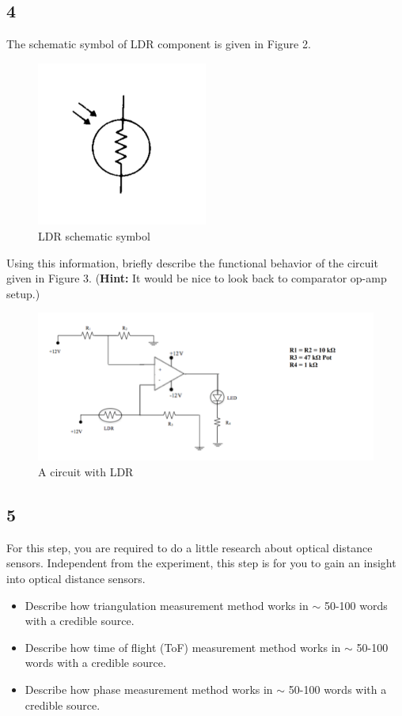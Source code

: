 \documentclass[letterpaper,12pt]{article}
\begin{document}
\subsection*{4}
The schematic symbol of LDR component is given in Figure 2.
\begin{figure}[H]
	\centering
	\includegraphics[width=0.5\textwidth]{LDR_symbol.png}
	\caption{LDR schematic symbol}
\end{figure} 
Using this information, briefly describe the functional behavior of the circuit given in Figure 3. (\textbf{Hint:} It would be nice to look back to comparator op-amp setup.)
\begin{figure}[H]
	\centering
	\includegraphics[width=1\textwidth]{darkness.png}
	\caption{A circuit with LDR}
\end{figure} 

\subsection*{5}
For this step, you are required to do a little research about optical distance sensors. Independent from the experiment, this step is for you to gain an insight into optical distance sensors.
\begin{itemize}
	\item Describe how triangulation measurement method works in \(\sim\) 50-100 words with a credible source. 
	\item Describe how time of flight (ToF) measurement method works in \(\sim\) 50-100 words with a credible source. 
	\item Describe how phase measurement method works in \(\sim\) 50-100 words with a credible source. 
\end{itemize}
\end{document}
